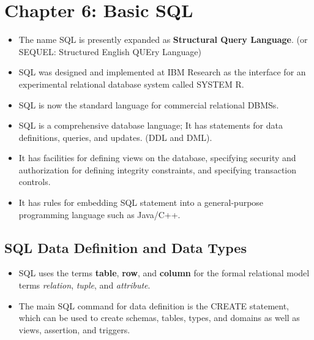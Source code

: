 \documentclass[10pt]{article}
\begin{document}
\section*{Chapter 6: Basic SQL}
\begin{itemize}
	\item The name SQL is presently expanded as \textbf{Structural Query Language}. (or SEQUEL: Structured English QUEry Language)
	\item SQL was designed and implemented at IBM Research as the interface for an experimental relational database system called SYSTEM R.
	\item SQL is now the standard language for commercial relational DBMSs.
	\item SQL is a comprehensive database language; It has statements for data definitions, queries, and updates. (DDL and DML).
	\item It has facilities for defining views on the database, specifying security and authorization for defining integrity constraints, and specifying transaction controls.
	\item It has rules for embedding SQL statement into a general-purpose programming language such as Java/C++.
\end{itemize}

\subsection{SQL Data Definition and Data Types}

\begin{itemize}
	\item SQL uses the terms \textbf{table}, \textbf{row}, and \textbf{column} for the formal relational model terms \textit{relation}, \textit{tuple}, and \textit{attribute}.
	\item The main SQL command for data definition is the CREATE statement, which can be used to create schemas, tables, types, and domains as well as views, assertion, and triggers. 	
\end{itemize}
\end{document}
